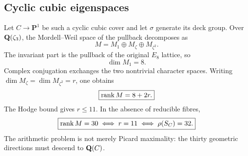 \subsection{Cyclic cubic eigenspaces}

Let $C\to\mathbf P^1$ be such a cyclic cubic cover and let $\sigma$ generate
its deck group.  Over $\mathbf Q(\zeta_3)$, the Mordell--Weil space of the pullback
decomposes as
\[
M=M_1\oplus M_{\zeta}\oplus M_{\zeta^2}.
\]
The invariant part is the pullback of the original $E_8$ lattice, so
\[
\dim M_1=8.
\]
Complex conjugation exchanges the two nontrivial character spaces.  Writing
$\dim M_{\zeta}=\dim M_{\zeta^2}=r$, one obtains
\[
\boxed{\operatorname{rank} M=8+2r.}
\]
The Hodge bound gives $r\le11$.  In the absence of reducible fibres,
\[
\boxed{
\operatorname{rank} M=30
\iff r=11
\iff \rho(S_C)=32.
}
\]
The arithmetic problem is not merely Picard maximality: the thirty geometric
directions must descend to $\mathbf Q(C)$.

